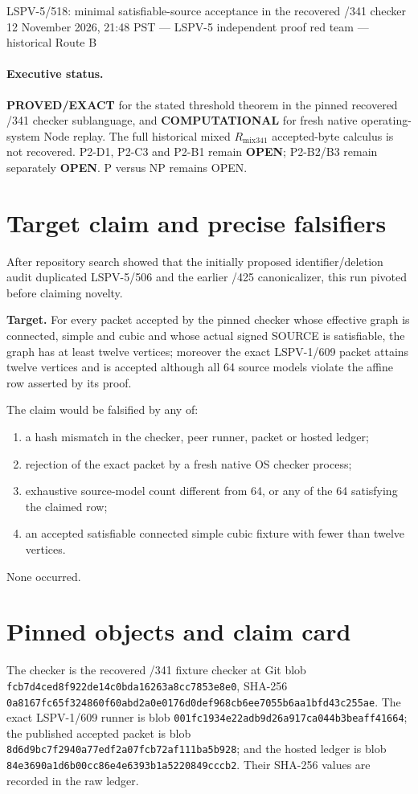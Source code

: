 \documentclass[11pt]{article}
\newcommand{\status}[1]{\textbf{#1}}
\begin{document}
\begin{center}
{\Large LSPV-5/518: minimal satisfiable-source acceptance in the recovered /341 checker}\\[3pt]
{\small 12 November 2026, 21:48 PST --- LSPV-5 independent proof red team --- historical Route B}
\end{center}

\paragraph{Executive status.}
\status{PROVED/EXACT} for the stated threshold theorem in the pinned recovered /341 checker sublanguage, and \status{COMPUTATIONAL} for fresh native operating-system Node replay.  The full historical mixed \(R_{\mathrm{mix341}}\) accepted-byte calculus is not recovered.  P2-D1, P2-C3 and P2-B1 remain \status{OPEN}; P2-B2/B3 remain separately \status{OPEN}.  P versus NP remains OPEN.

\section*{Target claim and precise falsifiers}
After repository search showed that the initially proposed identifier/deletion audit duplicated LSPV-5/506 and the earlier /425 canonicalizer, this run pivoted before claiming novelty.

\noindent\textbf{Target.}  For every packet accepted by the pinned checker whose effective graph is connected, simple and cubic and whose actual signed SOURCE is satisfiable, the graph has at least twelve vertices; moreover the exact LSPV-1/609 packet attains twelve vertices and is accepted although all 64 source models violate the affine row asserted by its proof.

The claim would be falsified by any of:
\begin{enumerate}
\item a hash mismatch in the checker, peer runner, packet or hosted ledger;
\item rejection of the exact packet by a fresh native OS checker process;
\item exhaustive source-model count different from 64, or any of the 64 satisfying the claimed row;
\item an accepted satisfiable connected simple cubic fixture with fewer than twelve vertices.
\end{enumerate}
None occurred.

\section*{Pinned objects and claim card}
The checker is the recovered /341 fixture checker at Git blob
\texttt{fcb7d4ced8f922de14c0bda16263a8cc7853e8e0}, SHA-256
\texttt{0a8167fc65f324860f60abd2a0e0176d0def968cb6ee7055b6aa1bfd43c255ae}.
The exact LSPV-1/609 runner is blob
\texttt{001fc1934e22adb9d26a917ca044b3beaff41664}; the published accepted packet is blob
\texttt{8d6d9bc7f2940a77edf2a07fcb72af111ba5b928}; and the hosted ledger is blob
\texttt{84e3690a1d6b00cc86e4e6393b1a5220849cccb2}.  Their SHA-256 values are recorded in the raw ledger.
\end{document}
